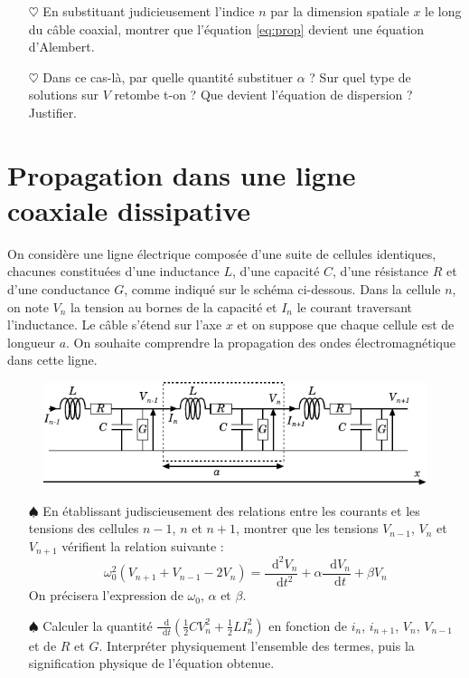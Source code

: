 \documentclass{report}
\newcommand*\dif{\mathop{}\!\mathrm{d}}
\begin{document}
\begin{itemize}

	\item[$\heartsuit$] En substituant judicieusement l'indice $n$ par la dimension spatiale $x$ le long du câble coaxial, montrer que l'équation \ref{eq:prop} devient une équation d'Alembert.
	
	\item[$\heartsuit$] Dans ce cas-là, par quelle quantité substituer $\alpha$ ? Sur quel type de solutions sur $V$ retombe t-on ? Que devient l'équation de dispersion ? Justifier. 

\end{itemize}

\newpage

\section*{Propagation dans une ligne coaxiale dissipative}

On considère une ligne électrique composée d'une suite de cellules identiques, chacunes constituées d'une inductance $L$, d'une capacité $C$, d'une résistance $R$ et d'une conductance $G$, comme indiqué sur le schéma ci-dessous. Dans la cellule $n$, on note $V_n$ la tension au bornes de la capacité et $I_n$ le courant traversant l'inductance. Le câble s'étend sur l'axe $x$ et on suppose que chaque cellule est de longueur $a$. On souhaite comprendre la propagation des ondes électromagnétique dans cette ligne. 

\begin{figure}[h!]
\centering
	\includegraphics[scale=1.5]{onde3_bis.pdf}
\end{figure}

\begin{itemize}

	\item[$\spadesuit$] En établissant judiscieusement des relations entre les courants et les tensions des cellules $n-1$, $n$ et $n+1$, montrer que les tensions $V_{n-1}$, $V_{n}$ et $V_{n+1}$ vérifient la relation suivante :
		\begin{equation}
		\omega_0^2(V_{n+1}+V_{n-1}-2V_n) = \frac{\dif^2 V_n}{\dif t^2} + \alpha\frac{\dif V_n}{\dif t} + \beta V_n
		\label{eq:prop}
	\end{equation}
	On précisera l'expression de $\omega_0$, $\alpha$ et $\beta$.
	
	 \item[$\spadesuit$] Calculer la quantité $\frac{\dif}{\dif t}\left( \frac{1}{2}CV_n^2 + \frac{1}{2}LI_n^2 \right)$ en fonction de $i_n$, $i_{n+1}$, $V_{n}$, $V_{n-1}$ et de $R$ et $G$. Interpréter physiquement l'ensemble des termes, puis la signification physique de l'équation obtenue. 

\end{itemize}
\end{document}
